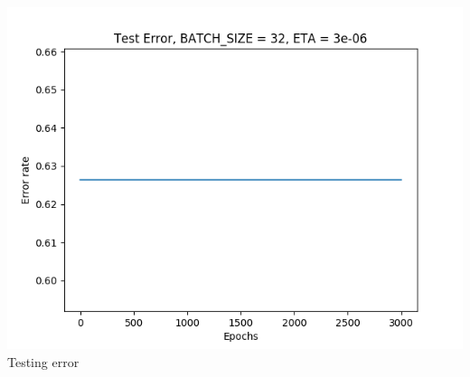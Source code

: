 \documentclass[11pt, a4paper]{article} %
\begin{document}
\includegraphics[scale = 0.6]{figure_2/TEE.png} %
\\
Testing error
\\
\end{document}
